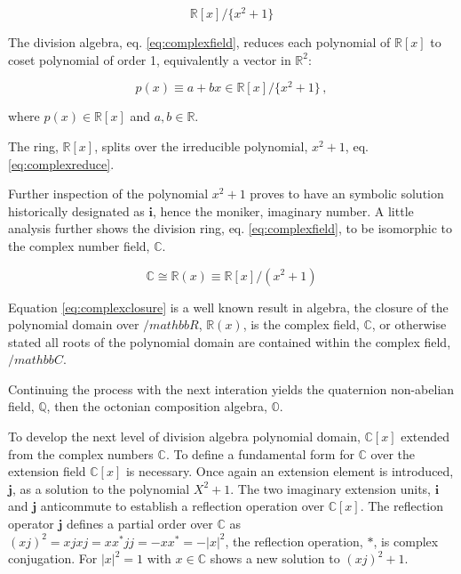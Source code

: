\documentclass[aps,twocolumn,secnumarabic,nobalancelastpage,amsmath,amssymb,
nofootinbib,parskip=full]{revtex4}
\newcommand{\di}[1]{\boldsymbol #1}
\begin{document}
\begin{equation} \label{eq:complexfield}
\mathbb{R}[x]/\{x^2+1\}
\end{equation}

The division algebra, eq. \ref{eq:complexfield}, reduces each polynomial
of $\mathbb{R}[x]$ to coset polynomial of order 1, equivalently
a vector in $\mathbb{R}^2$:

\begin{equation} \label{eq:complexreduce}
  p(x)\equiv a+bx \in \mathbb{R}[x]/\{x^2+1\}\, ,
\end{equation}
\begin{center}
where $p(x)\in\mathbb{R}[x]$ and $a,b\in\mathbb{R}$.
\end{center}

The ring, $\mathbb{R}[x]$, splits over the irreducible polynomial,
$x^2+1$, eq. \ref{eq:complexreduce}.

Further inspection of the polynomial $x^2+1$ proves to have an symbolic
solution historically designated as $\di{i}$, hence the moniker, imaginary
number. A little analysis further shows the division ring, eq.
\ref{eq:complexfield}, to be isomorphic to the complex number field, $\mathbb{C}$.

\begin{equation} \label{eq:complexclosure}
\mathbb{C}\cong\mathbb{R}(x)\equiv\mathbb{R}[x]/(x^2+1)
\end{equation}

Equation \ref{eq:complexclosure} is a well known result in algebra,
the closure of the polynomial domain over $/mathbb{R}$,
$\mathbb{R}(x)$, is the complex field, $\mathbb{C}$, or otherwise stated all
roots of the polynomial domain are contained within the complex field, $/mathbb{C}$.

Continuing the process with the next interation yields the quaternion non-abelian
field, $\mathbb{Q}$, then the octonian composition algebra, $\mathbb{O}$.

To develop the next level of division algebra polynomial domain, $\mathbb{C}[x]$ extended from the complex
numbers $\mathbb{C}$. To define a fundamental form for $\mathbb{C}$ over the extension field $\mathbb{C}[x]$
is necessary. Once again an extension element is introduced, $\di{j}$, as a solution to the polynomial $X^2+1$.
The two imaginary extension units, $\di{i}$ and $\di{j}$ anticommute to establish a reflection operation over
$\mathbb{C}[x]$. The reflection operator $\di{j}$ defines a partial order over $\mathbb{C}$ as
$(xj)^2=xjxj=xx^*jj=-xx^*=-|x|^2$, the reflection operation, $*$, is complex conjugation. For
$|x|^2=1$ with $x\in\mathbb{C}$ shows a new solution to $(xj)^2+1$. 
\end{document}
